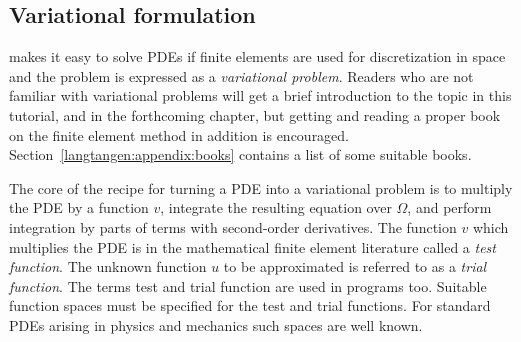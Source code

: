 \subsection{Variational formulation}
\label{langtangen:poisson1:varform}

\fenics{} makes it easy to solve PDEs if finite elements are
used for discretization in space and the problem is expressed as
a \emph{variational problem}. Readers who are not familiar with
variational problems will get a brief introduction to the topic in
this tutorial, and in the forthcoming chapter, but getting and reading
a proper book on the finite element method in addition is encouraged.
Section~\ref{langtangen:appendix:books} contains a list of some suitable
books.



The core of the recipe for turning a PDE into a variational problem
is to multiply the PDE by a function $v$, integrate the resulting
equation over $\Omega$, and perform integration by parts of terms with
second-order derivatives. The function $v$ which multiplies the PDE
is in the mathematical finite element literature called a \emph{test
function}. The unknown function $u$ to be approximated is referred to
as a \emph{trial function}. The terms test and trial function are used
in \fenics{} programs too.  Suitable function spaces must be specified
for the test and trial functions.  For standard PDEs arising in physics
and mechanics such spaces are well known.


